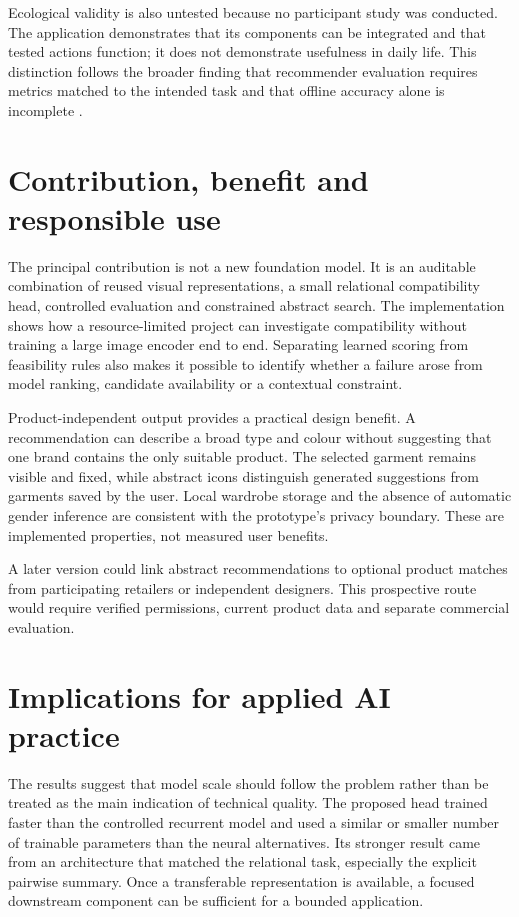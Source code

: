 Ecological validity is also untested because no participant study was
conducted. The application demonstrates that its components can be integrated
and that tested actions function; it does not demonstrate usefulness in daily
life. This distinction follows the broader finding that recommender evaluation
requires metrics matched to the intended task and that offline accuracy alone
is incomplete \parencite{herlocker2004evaluation,deldjoo2023review}.

\section{Contribution, benefit and responsible use}

The principal contribution is not a new foundation model. It is an auditable
combination of reused visual representations, a small relational compatibility
head, controlled evaluation and constrained abstract search. The
implementation shows how a resource-limited project can investigate
compatibility without training a large image encoder end to end. Separating
learned scoring from feasibility rules also makes it possible to identify
whether a failure arose from model ranking, candidate availability or a
contextual constraint.

Product-independent output provides a practical design benefit. A
recommendation can describe a broad type and colour without suggesting that
one brand contains the only suitable product. The selected garment remains
visible and fixed, while abstract icons distinguish generated suggestions from
garments saved by the user. Local wardrobe storage and the absence of automatic
gender inference are consistent with the prototype's privacy boundary. These
are implemented properties, not measured user benefits.

A later version could link abstract recommendations to optional product matches
from participating retailers or independent designers. This prospective route
would require verified permissions, current product data and separate
commercial evaluation.

\section{Implications for applied AI practice}

The results suggest that model scale should follow the problem rather than be
treated as the main indication of technical quality. The proposed head trained
faster than the controlled recurrent model and used a similar or smaller number
of trainable parameters than the neural alternatives. Its stronger result came
from an architecture that matched the relational task, especially the explicit
pairwise summary. Once a transferable representation is available, a
focused downstream component can be sufficient for a bounded application.

